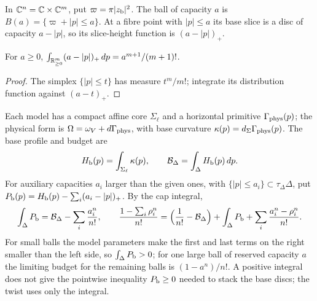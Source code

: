 \begin{definition}\label{I:def:mech-toric-ball}
In $\mathbb{C}^n=\mathbb{C}\times\mathbb{C}^m$, put $\varpi=\pi|z_{\rm b}|^2$. The ball of capacity $a$ is
$B(a)=\{\varpi+|p|\le a\}$. At a fibre point with $|p|\le a$ its base slice is a disc of capacity $a-|p|$, so its
slice-height function is $(a-|p|)_+$.
\end{definition}

\begin{lemma}\label{I:lem:mech-toric-volume}
For $a\ge0$, $\int_{\mathbb{R}^m_{\ge0}}(a-|p|)_+\,dp=a^{m+1}/(m+1)!$.
\end{lemma}
\begin{proof}
The simplex $\{|p|\le t\}$ has measure $t^m/m!$; integrate its distribution function against $(a-t)_+$.
\end{proof}

Each model has a compact affine core $\Sigma_\ell$ and a horizontal primitive $\Gamma_{\rm phys}(p)$; the physical form is
$\Omega=\omega_V+d\Gamma_{\rm phys}$, with base curvature $\kappa(p)=d_\Sigma\Gamma_{\rm phys}(p)$. The base profile and budget
are
\begin{equation}\label{I:eq:mech-model-volume}
 H_{\mathrm b}(p)=\int_{\Sigma_\ell}\kappa(p),\qquad
 \mathcal B_\Delta=\int_\Delta H_{\mathrm b}(p)\,dp .
\end{equation}
For auxiliary capacities $a_i$ larger than the given ones, with $\{|p|\le a_i\}\subset\tau_\Delta\Delta$, put
$P_{\mathrm b}(p)=H_{\mathrm b}(p)-\sum_i(a_i-|p|)_+$. By the cap integral,
\begin{equation}\label{I:eq:mech-mean}
 \int_\Delta P_{\mathrm b}=\mathcal B_\Delta-\sum_i\frac{a_i^n}{n!},\qquad
 \frac{1-\sum_i\rho_i^n}{n!}
 =\Big(\frac1{n!}-\mathcal B_\Delta\Big)+\int_\Delta P_{\mathrm b}+\sum_i\frac{a_i^n-\rho_i^n}{n!}.
\end{equation}
For small balls the model parameters make the first and last terms on the right smaller than the left side, so
$\int_\Delta P_{\mathrm b}>0$; for one large ball of reserved capacity $a$ the limiting budget for the remaining balls is
$(1-a^n)/n!$. A positive integral does not give the pointwise inequality $P_{\mathrm b}\ge0$ needed to stack the base discs; the
twist uses only the integral.

